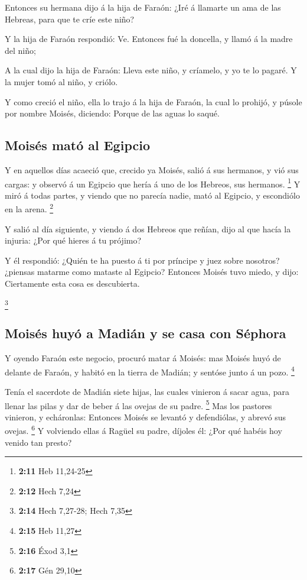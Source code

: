  Entonces su hermana dijo á la hija de Faraón: ¿Iré á
llamarte un ama de las Hebreas, para que te críe este niño?

 Y la hija de Faraón respondió: Ve. Entonces fué la
doncella, y llamó á la madre del niño;

 A la cual dijo la hija de Faraón: Lleva este niño, y
críamelo, y yo te lo pagaré. Y la mujer tomó al niño, y criólo.

 Y como creció el niño, ella lo trajo á la hija de Faraón,
la cual lo prohijó, y púsole por nombre Moisés, diciendo: Porque de las
aguas lo saqué.

\hypertarget{moisuxe9s-matuxf3-al-egipcio}{%
\subsection{Moisés mató al Egipcio}\label{moisuxe9s-matuxf3-al-egipcio}}

 Y en aquellos días acaeció que, crecido ya Moisés, salió á
sus hermanos, y vió sus cargas: y observó á un Egipcio que hería á uno
de los Hebreos, sus hermanos. \footnote{\textbf{2:11} Heb 11,24-25}
 Y miró á todas partes, y viendo que no parecía nadie, mató
al Egipcio, y escondiólo en la arena. \footnote{\textbf{2:12} Hech 7,24}

 Y salió al día siguiente, y viendo á dos Hebreos que
reñían, dijo al que hacía la injuria: ¿Por qué hieres á tu prójimo?

 Y él respondió: ¿Quién te ha puesto á ti por príncipe y
juez sobre nosotros? ¿piensas matarme como mataste al Egipcio? Entonces
Moisés tuvo miedo, y dijo: Ciertamente esta cosa es descubierta.

\footnote{\textbf{2:14} Hech 7,27-28; Hech 7,35}

\hypertarget{moisuxe9s-huyuxf3-a-madiuxe1n-y-se-casa-con-suxe9phora}{%
\subsection{Moisés huyó a Madián y se casa con
Séphora}\label{moisuxe9s-huyuxf3-a-madiuxe1n-y-se-casa-con-suxe9phora}}

 Y oyendo Faraón este negocio, procuró matar á Moisés: mas
Moisés huyó de delante de Faraón, y habitó en la tierra de Madián; y
sentóse junto á un pozo. \footnote{\textbf{2:15} Heb 11,27}

 Tenía el sacerdote de Madián siete hijas, las cuales
vinieron á sacar agua, para llenar las pilas y dar de beber á las ovejas
de su padre. \footnote{\textbf{2:16} Éxod 3,1}  Mas los
pastores vinieron, y echáronlas: Entonces Moisés se levantó y
defendiólas, y abrevó sus ovejas. \footnote{\textbf{2:17} Gén 29,10}
 Y volviendo ellas á Ragüel su padre, díjoles él: ¿Por qué
habéis hoy venido tan presto?

